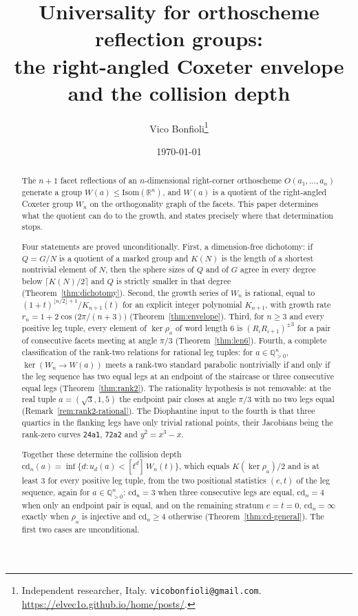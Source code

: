 \documentclass[11pt,a4paper]{article}
\title{\textbf{Universality for orthoscheme reflection groups:\\
the right-angled Coxeter envelope and the collision depth}}
\author{Vico Bonfioli\thanks{Independent researcher, Italy.
\texttt{vicobonfioli@gmail.com}.\,
\url{https://elvec1o.github.io/home/posts/}.}}
\date{\today}
\newcommand{\R}{\mathbb{R}}
\newcommand{\Q}{\mathbb{Q}}
\newcommand{\Isom}{\mathrm{Isom}}
\newcommand{\cd}{\mathrm{cd}}
\theoremstyle{definition}
\theoremstyle{remark}
\theoremstyle{plain}
\begin{document}
\sloppy
\maketitle

\begin{abstract}
The $n+1$ facet reflections of an $n$-dimensional right-corner orthoscheme
$O(a_1,\dots,a_n)$ generate a group $W(a)\le\Isom(\R^n)$, and $W(a)$ is a quotient of the
right-angled Coxeter group $W_n$ on the orthogonality graph of the facets. This paper
determines what the quotient can do to the growth, and states precisely where that
determination stops.

Four statements are proved unconditionally. First, a dimension-free dichotomy: if $Q=G/N$
is a quotient of a marked group and $K(N)$ is the length of a shortest nontrivial element of
$N$, then the sphere sizes of $Q$ and of $G$ agree in every degree below $\lceil K(N)/2\rceil$
and $Q$ is strictly smaller in that degree (Theorem~\ref{thm:dichotomy}). Second, the growth
series of $W_n$ is rational, equal to $(1+t)^{\lfloor n/2\rfloor+1}/K_{n+1}(t)$ for an explicit
integer polynomial $K_{n+1}$, with growth rate $r_n=1+2\cos\bigl(2\pi/(n+3)\bigr)$
(Theorem~\ref{thm:envelope}). Third, for $n\ge3$ and every positive leg tuple, every element of
$\ker\rho_a$ of word length $6$ is $(R_iR_{i+1})^{\pm3}$ for a pair of consecutive facets
meeting at angle $\pi/3$ (Theorem~\ref{thm:len6}). Fourth, a complete classification of the
rank-two relations for rational leg tuples: for $a\in\Q_{>0}^n$, $\ker(W_n\to W(a))$ meets a
rank-two standard parabolic nontrivially if and only if the leg sequence has two equal legs at
an endpoint of the staircase or three consecutive equal legs (Theorem~\ref{thm:rank2}). The
rationality hypothesis is not removable: at the real tuple $a=(\sqrt3,1,5)$ the endpoint pair
closes at angle $\pi/3$ with no two legs equal (Remark~\ref{rem:rank2-rational}). The
Diophantine input to the fourth is that
three quartics in the flanking legs have only trivial rational points, their Jacobians being
the rank-zero curves \texttt{24a1}, \texttt{72a2} and $y^2=x^3-x$.

Together these determine the collision depth
$\cd_n(a)=\inf\{d:u_d(a)<[t^d]\,W_n(t)\}$, which equals $K(\ker\rho_a)/2$ and is at least $3$
for every positive leg tuple, from the two positional statistics $(e,t)$ of the leg sequence,
again for $a\in\Q_{>0}^n$:
$\cd_n=3$ when three consecutive legs are equal, $\cd_n=4$ when only an endpoint pair is equal,
and on the remaining stratum $e=t=0$, $\cd_n=\infty$ exactly when $\rho_a$ is injective and
$\cd_n\ge4$ otherwise (Theorem~\ref{thm:cd-general}). The first two cases are unconditional.


\end{abstract}
\end{document}
